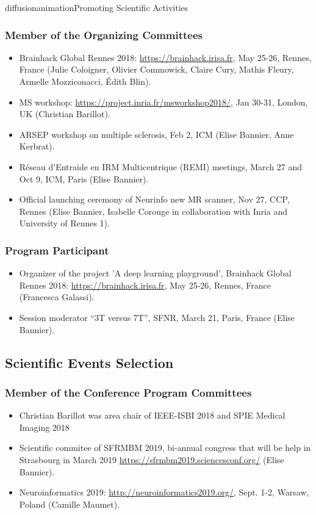 \documentclass{ra2018}
\begin{document}
\begin{module}{diffusion}{animation}{Promoting Scientific Activities}
    \subsubsection{Member of the Organizing Committees}
    \begin{itemize}
        \item Brainhack Global Rennes 2018: \url{https://brainhack.irisa.fr}, May 25-26, Rennes, France (Julie Coloigner, Olivier Commowick, Claire Cury, Mathis Fleury, Armelle Mozziconacci, Édith Blin).
	    \item MS workshop: \url{https://project.inria.fr/msworkshop2018/}, Jan 30-31, London, UK (Christian Barillot).
        \item ARSEP workshop on multiple sclerosis, Feb 2, ICM (Elise Bannier, Anne Kerbrat).
        \item Réseau d'Entraide en IRM Multicentrique (REMI) meetings, March 27 and Oct 9, ICM, Paris (Elise Bannier).
        \item Official launching ceremony of Neurinfo new MR scanner, Nov 27, CCP, Rennes (Elise Bannier, Isabelle Corouge in collaboration with Inria and University of Rennes 1).

    \end{itemize}    
    \subsubsection{Program Participant}
    \begin{itemize}
        \item Organizer of the project 'A deep learning playground', Brainhack Global Rennes 2018: \url{https://brainhack.irisa.fr}, May 25-26, Rennes, France (Francesca Galassi).
        \item Session moderator ``3T versus 7T'', SFNR, March 21, Paris, France (Elise Bannier).
    \end{itemize}  
\subsection {Scientific Events Selection}
    \subsubsection{Member of the Conference Program Committees}
    \begin{itemize}
               \item Christian Barillot was area chair of IEEE-ISBI 2018 and SPIE Medical Imaging 2018
               \item Scientific commitee of SFRMBM 2019, bi-annual congress that will be help in Strasbourg in March 2019 \url{https://sfrmbm2019.sciencesconf.org/} (Elise Bannier).
        \item Neuroinformatics 2019: \url{http://neuroinformatics2019.org/}, Sept. 1-2, Warsaw, Poland (Camille Maumet).
    \end{itemize}

\end{module}
\end{document}
